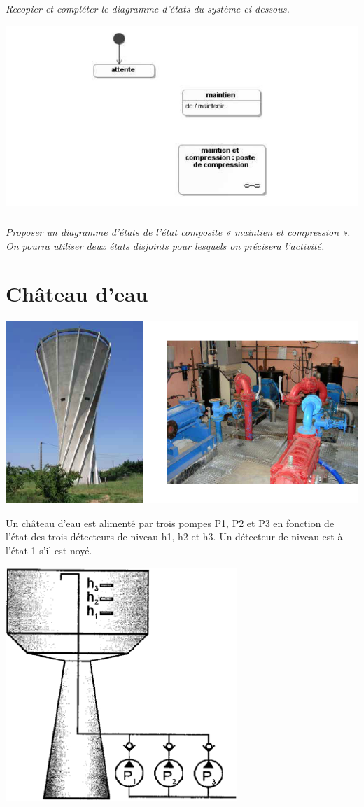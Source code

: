 \documentclass[10pt]{article}
\begin{document}
\subparagraph{}
\textit{Recopier et compléter le diagramme d’états du système ci-dessous.}


\begin{center}
\includegraphics[width=.75\textwidth]{images/fig_13}
\end{center}

\subparagraph{}
\textit{Proposer un diagramme d’états de l’état composite « maintien et compression ». On pourra utiliser deux états disjoints pour lesquels on précisera l’activité.}

\section*{Château d'eau}
\begin{center}
\includegraphics[width=.5\textwidth]{images/fig_14}
\end{center}
\setcounter{subparagraph}{0}

Un château d’eau est alimenté par trois pompes P1, P2 et P3 en fonction de l’état des trois
détecteurs de niveau h1, h2 et h3. Un détecteur de niveau est à l’état 1 s’il est noyé.

\begin{center}
\includegraphics[width=.5\textwidth]{images/fig_15}
\end{center}
\end{document}
